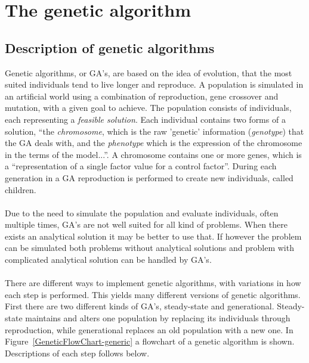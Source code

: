 \section{The genetic algorithm}
\subsection{Description of genetic algorithms}
Genetic algorithms, or GA's, are based on the idea of evolution, that the most suited individuals tend to live longer and reproduce. A population is simulated in an artificial world using a combination of reproduction, gene crossover and mutation, with a given goal to achieve. The population consists of individuals, each representing a \emph{feasible  solution}. Each individual contains two forms of a solution, ``the \textit{chromosome}, which is the raw 'genetic' information (\textit{genotype}) that the GA deals with, and the \textit{phenotype} which is the expression of the chromosome in the terms of the model...''\cite{GAHandbook1}. %
A chromosome contains one or more genes, which is a ``representation of a single factor value for a control factor''\cite{GAHandbook1}. %
 During each generation in a GA reproduction is performed to create new individuals, called children.\\\\
Due to the need to simulate the population and evaluate individuals, often multiple times, GA's are not well suited for all kind of problems. When there exists an analytical solution it may be better to use that. %
If however the problem can be simulated both problems without analytical solutions and problem with complicated analytical solution can be handled by GA's.\\\\
There are different ways to implement genetic algorithms, with variations in how each step is performed. This yields many different versions of genetic algorithms. First there are two different kinds of GA's, steady-state and generational. Steady-state maintains and alters one population by replacing its individuals through reproduction, while generational replaces an old population with a new one. In Figure~\ref{GeneticFlowChart-generic} a flowchart of a genetic algorithm is shown. Descriptions of each step follows below.\\\\

